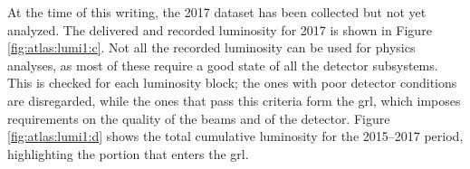 At the time of this writing, the 2017 dataset has been collected but not yet analyzed. The delivered and recorded luminosity for 2017 is shown in Figure \ref{fig:atlas:lumi1:c}. Not all the recorded luminosity can be used for physics analyses, as most of these require a good state of all the detector subsystems. This is checked for each luminosity block; the ones with poor detector conditions are disregarded, while the ones that pass this criteria form the \gls{grl}, which imposes requirements on the quality of the beams and of the detector. Figure \ref{fig:atlas:lumi1:d} shows the total cumulative luminosity for the 2015--2017 period, highlighting the portion that enters the \gls{grl}. 

